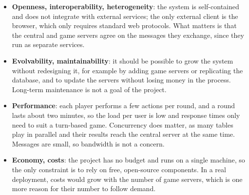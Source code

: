 \documentclass{scrartcl}
\begin{document}
\begin{itemize}
    The same money can be requested concurrently, so updates must be coordinated to never spend a balance twice or lose part of it.
    Seats are shared in the same way, as a player must not be seated at two tables at once.
    \item \textbf{Openness, interoperability, heterogeneity}: the system is self-contained and does not integrate with external services; the only external client is the browser, which only requires standard web protocols.
    What matters is that the central and game servers agree on the messages they exchange, since they run as separate services.
    \item \textbf{Evolvability, maintainability}: it should be possible to grow the system without redesigning it, for example by adding game servers or replicating the database, and to update the servers without losing money in the process.
    Long-term maintenance is not a goal of the project.
    \item \textbf{Performance}: each player performs a few actions per round, and a round lasts about two minutes, so the load per user is low and response times only need to suit a turn-based game.
    Concurrency does matter, as many tables play in parallel and their results reach the central server at the same time.
    Messages are small, so bandwidth is not a concern.
    \item \textbf{Economy, costs}: the project has no budget and runs on a single machine, so the only constraint is to rely on free, open-source components.
    In a real deployment, costs would grow with the number of game servers, which is one more reason for their number to follow demand.
\end{itemize}


\end{document}
